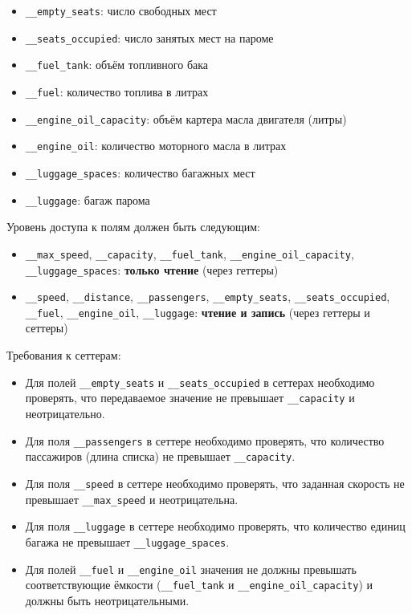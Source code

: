 \begin{enumerate}
\begin{itemize}
    \item \texttt{\_\_empty\_seats}: число свободных мест  
    \item \texttt{\_\_seats\_occupied}: число занятых мест на пароме  
    \item \texttt{\_\_fuel\_tank}: объём топливного бака  
    \item \texttt{\_\_fuel}: количество топлива в литрах  
    \item \texttt{\_\_engine\_oil\_capacity}: объём картера масла двигателя (литры)  
    \item \texttt{\_\_engine\_oil}: количество моторного масла в литрах  
    \item \texttt{\_\_luggage\_spaces}: количество багажных мест  
    \item \texttt{\_\_luggage}: багаж парома  
\end{itemize}
Уровень доступа к полям должен быть следующим:
\begin{itemize}
    \item \texttt{\_\_max\_speed}, \texttt{\_\_capacity}, \texttt{\_\_fuel\_tank}, \texttt{\_\_engine\_oil\_capacity}, \texttt{\_\_luggage\_spaces}: \textbf{только чтение} (через геттеры)  
    \item \texttt{\_\_speed}, \texttt{\_\_distance}, \texttt{\_\_passengers}, \texttt{\_\_empty\_seats}, \texttt{\_\_seats\_occupied}, \texttt{\_\_fuel}, \texttt{\_\_engine\_oil}, \texttt{\_\_luggage}: \textbf{чтение и запись} (через геттеры и сеттеры)
\end{itemize}
Требования к сеттерам:
\begin{itemize}
    \item Для полей \texttt{\_\_empty\_seats} и \texttt{\_\_seats\_occupied} в сеттерах необходимо проверять, что передаваемое значение не превышает \texttt{\_\_capacity} и неотрицательно.  
    \item Для поля \texttt{\_\_passengers} в сеттере необходимо проверять, что количество пассажиров (длина списка) не превышает \texttt{\_\_capacity}.  
    \item Для поля \texttt{\_\_speed} в сеттере необходимо проверять, что заданная скорость не превышает \texttt{\_\_max\_speed} и неотрицательна.  
    \item Для поля \texttt{\_\_luggage} в сеттере необходимо проверять, что количество единиц багажа не превышает \texttt{\_\_luggage\_spaces}.
    \item Для полей \texttt{\_\_fuel} и \texttt{\_\_engine\_oil} значения не должны превышать соответствующие ёмкости (\texttt{\_\_fuel\_tank} и \texttt{\_\_engine\_oil\_capacity}) и должны быть неотрицательными.

\end{itemize}
\end{enumerate}
